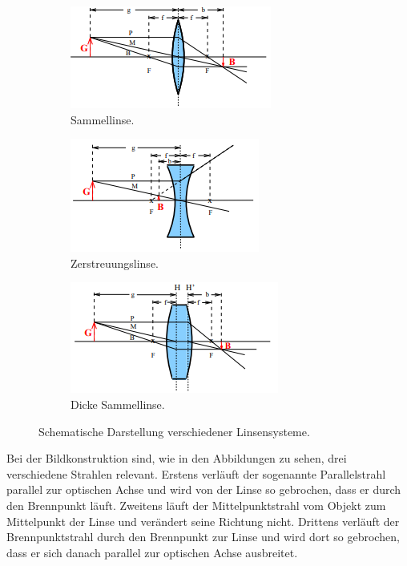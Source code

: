     \begin{figure}
        \centering
        \begin{subfigure}{0.48\textwidth}
            \centering
            \includegraphics{content/sammel.png}
            \caption{Sammellinse.}
            \label{fig:sammel}
        \end{subfigure}
            \begin{subfigure}{0.48\textwidth}
            \centering
            \includegraphics{content/zerstreu.png}
            \caption{Zerstreuungslinse.}
            \label{fig:zerstreu}
        \end{subfigure}
        \begin{subfigure}{0.48\textwidth}
            \centering
            \includegraphics{content/dick.png}
            \caption{Dicke Sammellinse.}
            \label{fig:dick}
        \end{subfigure}
            \caption{Schematische Darstellung verschiedener Linsensysteme.}
            \label{fig:linsen}
        \end{figure}
    Bei der Bildkonstruktion
    sind, wie in den Abbildungen zu sehen, drei verschiedene Strahlen relevant. Erstens verläuft der sogenannte Parallelstrahl parallel 
    zur optischen Achse und wird von der Linse so gebrochen, dass er durch den Brennpunkt läuft. Zweitens läuft der Mittelpunktstrahl
    vom Objekt zum Mittelpunkt der Linse und verändert seine Richtung nicht. Drittens verläuft der Brennpunktstrahl durch den Brennpunkt
    zur Linse und wird dort so gebrochen, dass er sich danach parallel zur optischen Achse ausbreitet.

